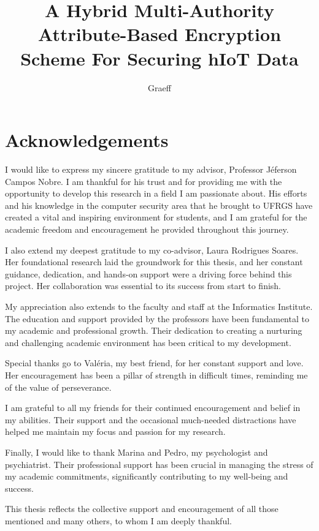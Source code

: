 \documentclass[cic,tc,english]{iiufrgs}
\title{
    A Hybrid Multi-Authority Attribute-Based Encryption Scheme For Securing hIoT Data
}
\author{Graeff}{Felipe de Almeida}
\numberwithin{algorithm}{chapter}
\begin{document}
\maketitle



\chapter*{Acknowledgements}
    I would like to express my sincere gratitude to my advisor, Professor Jéferson Campos Nobre. I am thankful for his trust and for providing me with the opportunity to develop this research in a field I am passionate about. His efforts and his knowledge in the computer security area that he brought to UFRGS have created a vital and inspiring environment for students, and I am grateful for the academic freedom and encouragement he provided throughout this journey.

    I also extend my deepest gratitude to my co-advisor, Laura Rodrigues Soares. Her foundational research laid the groundwork for this thesis, and her constant guidance, dedication, and hands-on support were a driving force behind this project. Her collaboration was essential to its success from start to finish.

    My appreciation also extends to the faculty and staff at the Informatics Institute. The education and support provided by the professors have been fundamental to my academic and professional growth. Their dedication to creating a nurturing and challenging academic environment has been critical to my development.

    Special thanks go to Valéria, my best friend, for her constant support and love. Her encouragement has been a pillar of strength in difficult times, reminding me of the value of perseverance.

    I am grateful to all my friends for their continued encouragement and belief in my abilities. Their support and the occasional much-needed distractions have helped me maintain my focus and passion for my research.

    Finally, I would like to thank Marina and Pedro, my psychologist and psychiatrist. Their professional support has been crucial in managing the stress of my academic commitments, significantly contributing to my well-being and success.

    This thesis reflects the collective support and encouragement of all those mentioned and many others, to whom I am deeply thankful.
\end{document}
